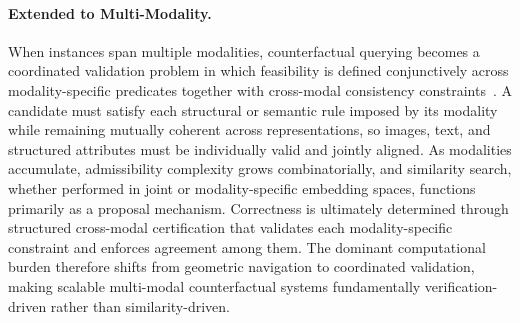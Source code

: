 \paragraph{Extended to Multi-Modality.}
When instances span multiple modalities, counterfactual querying becomes a coordinated validation problem in which feasibility is defined conjunctively across modality-specific predicates together with cross-modal consistency constraints~\cite{chen2019cross}. A candidate must satisfy each structural or semantic rule imposed by its modality while remaining mutually coherent across representations, so images, text, and structured attributes must be individually valid and jointly aligned. As modalities accumulate, admissibility complexity grows combinatorially, and similarity search, whether performed in joint or modality-specific embedding spaces, functions primarily as a proposal mechanism. Correctness is ultimately determined through structured cross-modal certification that validates each modality-specific constraint and enforces agreement among them. The dominant computational burden therefore shifts from geometric navigation to coordinated validation, making scalable multi-modal counterfactual systems fundamentally verification-driven rather than similarity-driven.
